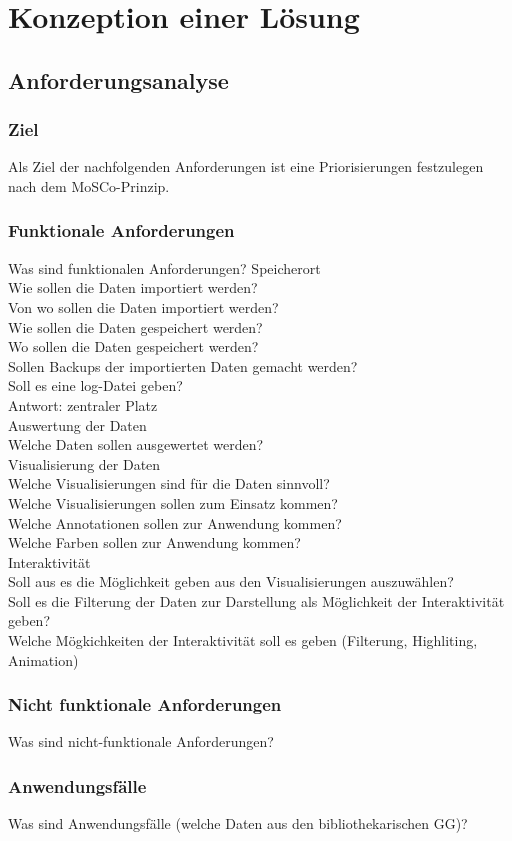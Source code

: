\chapter{Konzeption einer Lösung}

\section{Anforderungsanalyse}


\subsection{Ziel}
Als Ziel der nachfolgenden Anforderungen ist  eine Priorisierungen festzulegen nach dem MoSCo-Prinzip.
\subsection{Funktionale Anforderungen}
Was sind funktionalen Anforderungen?
Speicherort\\
Wie sollen die Daten importiert werden?\\
Von wo sollen die Daten importiert werden?\\
Wie sollen die Daten gespeichert werden?\\
Wo sollen die Daten gespeichert werden?\\
Sollen Backups der importierten Daten gemacht werden?\\
Soll es eine log-Datei geben?\\
Antwort: zentraler Platz\\

Auswertung der Daten\\
Welche Daten sollen ausgewertet werden?\\



Visualisierung der Daten\\
Welche Visualisierungen sind für die Daten sinnvoll?\\
Welche Visualisierungen sollen zum Einsatz kommen?\\
Welche Annotationen sollen zur Anwendung kommen?\\
Welche Farben sollen zur Anwendung kommen?\\



Interaktivität\\
Soll aus es die Möglichkeit geben aus den Visualisierungen auszuwählen?\\
Soll es die Filterung der Daten zur Darstellung als Möglichkeit der Interaktivität geben?\\
Welche Mögkichkeiten der Interaktivität soll es geben (Filterung, Highliting, Animation)\\
\subsection{Nicht funktionale Anforderungen}
Was sind nicht-funktionale Anforderungen?
\subsection{Anwendungsfälle}
Was sind Anwendungsfälle (welche Daten aus den bibliothekarischen GG)? 

